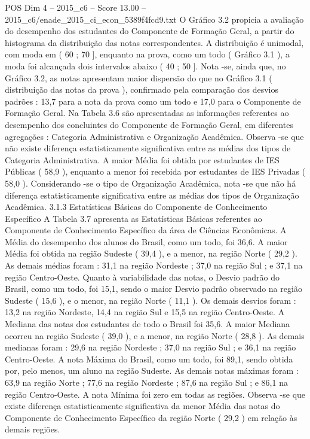 \begin{textsample}{POS Dim 4 – 2015\_c6 – Score 13.00 – 2015\_c6/enade\_2015\_ci\_econ\_5389f4fcd9.txt}
O Gráfico 3.2 propicia a avaliação do desempenho dos estudantes do Componente de Formação Geral, a partir do histograma da distribuição das notas correspondentes.
A distribuição é unimodal, com moda em ( 60 ; 70 ], enquanto na prova, como um todo ( Gráfico 3.1 ), a moda foi alcançada dois intervalos abaixo ( 40 ; 50 ].
Nota -se, ainda que, no Gráfico 3.2, as notas apresentam maior dispersão do que no Gráfico 3.1 ( distribuição das notas da prova ), confirmado pela comparação dos desvios padrões : 13,7 para a nota da prova como um todo e 17,0 para o Componente de Formação Geral.
Na Tabela 3.6 são apresentadas as informações referentes ao desempenho dos concluintes do Componente de Formação Geral, em diferentes agregações : Categoria Administrativa e Organização Acadêmica.
Observa -se que não existe diferença estatisticamente significativa entre as médias dos tipos de Categoria Administrativa.
A maior Média foi obtida por estudantes de IES Públicas ( 58,9 ), enquanto a menor foi recebida por estudantes de IES Privadas ( 58,0 ).
Considerando -se o tipo de Organização Acadêmica, nota -se que não há diferença estatisticamente significativa entre as médias dos tipos de Organização Acadêmica. 3.1.3 Estatísticas Básicas do Componente de Conhecimento Específico A Tabela 3.7 apresenta as Estatísticas Básicas referentes ao Componente de Conhecimento Específico da área de Ciências Econômicas.
A Média do desempenho dos alunos do Brasil, como um todo, foi 36,6.
A maior Média foi obtida na região Sudeste ( 39,4 ), e a menor, na região Norte ( 29,2 ).
As demais médias foram : 31,1 na região Nordeste ; 37,0 na região Sul ; e 37,1 na região Centro-Oeste.
Quanto à variabilidade das notas, o Desvio padrão do Brasil, como um todo, foi 15,1, sendo o maior Desvio padrão observado na região Sudeste ( 15,6 ), e o menor, na região Norte ( 11,1 ).
Os demais desvios foram : 13,2 na região Nordeste, 14,4 na região Sul e 15,5 na região Centro-Oeste.
A Mediana das notas dos estudantes de todo o Brasil foi 35,6.
A maior Mediana ocorreu na região Sudeste ( 39,0 ), e a menor, na região Norte ( 28,8 ).
As demais medianas foram : 29,6 na região Nordeste ; 37,0 na região Sul ; e 36,1 na região Centro-Oeste.
A nota Máxima do Brasil, como um todo, foi 89,1, sendo obtida por, pelo menos, um aluno na região Sudeste.
As demais notas máximas foram : 63,9 na região Norte ; 77,6 na região Nordeste ; 87,6 na região Sul ; e 86,1 na região Centro-Oeste.
A nota Mínima foi zero em todas as regiões.
Observa -se que existe diferença estatisticamente significativa da menor Média das notas do Componente de Conhecimento Específico da região Norte ( 29,2 ) em relação às demais regiões.

\end{textsample}
